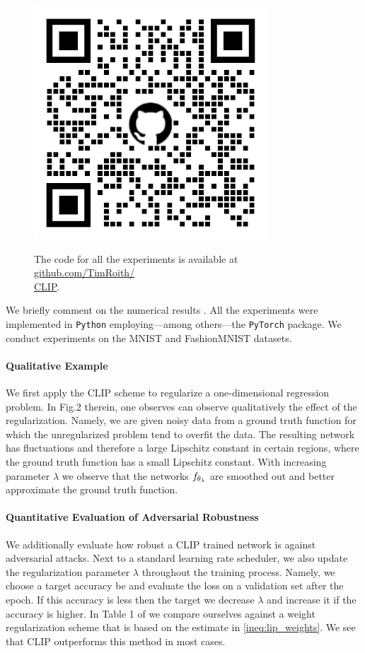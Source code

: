 \begin{figure}
\begin{center}
\includegraphics[width=.4\textwidth]{atelier/CLIP/CLIPQR.png}
\end{center}
The code for all the experiments is available at \href{https://github.com/TimRoith/CLIP}{github.com/TimRoith/}\\
\href{https://github.com/TimRoith/CLIP}{CLIP}.
\end{figure}
We briefly comment on the numerical results \cite{bungert2021clip}. All the experiments were implemented in \texttt{Python} \cite{van1995python} employing---among others---the \texttt{PyTorch} \cite{paszke2019pytorch} package. We conduct experiments on the MNIST \cite{leCun10} and FashionMNIST \cite{Han17} datasets.

\paragraph{Qualitative Example} We first apply the CLIP scheme to regularize a one-dimensional regression problem. In Fig.2 therein, one observes can observe qualitatively the effect of the regularization. Namely, we are given noisy data from a ground truth function for which the unregularized problem tend to overfit the data. The resulting network has fluctuations and therefore a large Lipschitz constant in certain regions, where the ground truth function has a small Lipschitz constant. With increasing parameter $\lambda$ we observe that the networks $f_{\theta_\lambda}$ are smoothed out and better approximate the ground truth function.
%
\paragraph{Quantitative Evaluation of Adversarial Robustness} We additionally evaluate how robust a CLIP trained network is against adversarial attacks. Next to a standard learning rate scheduler, we also update the regularization parameter $\lambda$ throughout the training process. Namely, we choose a target accuracy be and evaluate the loss on a validation set after the epoch. If this accuracy is less then the target we decrease $\lambda$ and increase it if the accuracy is higher. In Table 1 of \cite{bungert2021clip} we compare ourselves against a weight regularization scheme that is based on the estimate in \cref{ineq:lip_weights}. We see that CLIP outperforms this method in most cases.
%
%
%
%
%
%
%
%
\clearpage%
